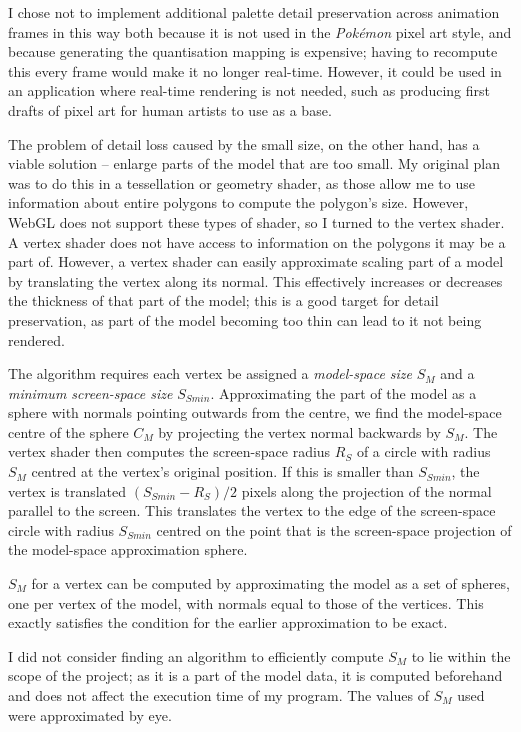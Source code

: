 \documentclass[12pt,twoside,notitlepage]{report}
\begin{document}
I chose not to implement additional palette detail preservation across animation frames in this way both because it is not used in the \textit{Pok\'{e}mon} pixel art style, and because generating the quantisation mapping is expensive; having to recompute this every frame would make it no longer real-time. However, it could be used in an application where real-time rendering is not needed, such as producing first drafts of pixel art for human artists to use as a base.

The problem of detail loss caused by the small size, on the other hand, has a viable solution -- enlarge parts of the model that are too small. My original plan was to do this in a tessellation or geometry shader, as those allow me to use information about entire polygons to compute the polygon's size. However, WebGL does not support these types of shader, so I turned to the vertex shader. A vertex shader does not have access to information on the polygons it may be a part of. However, a vertex shader can easily approximate scaling part of a model by translating the vertex along its normal. This effectively increases or decreases the thickness of that part of the model; this is a good target for detail preservation, as part of the model becoming too thin can lead to it not being rendered.

The algorithm requires each vertex be assigned a \textit{model-space size} $S_{M}$ and a \textit{minimum screen-space size} $S_{Smin}$. Approximating the part of the model as a sphere with normals pointing outwards from the centre, we find the model-space centre of the sphere $C_{M}$ by projecting the vertex normal backwards by $S_{M}$. The vertex shader then computes the screen-space radius $R_{S}$ of a circle with radius $S_{M}$ centred at the vertex's original position. If this is smaller than $S_{Smin}$, the vertex is translated $(S_{Smin} - R_{S}) / 2$ pixels along the projection of the normal parallel to the screen. This translates the vertex to the edge of the screen-space circle with radius $S_{Smin}$ centred on the point that is the screen-space projection of the model-space approximation sphere.

$S_{M}$ for a vertex can be computed by approximating the model as a set of spheres, one per vertex of the model, with normals equal to those of the vertices. This exactly satisfies the condition for the earlier approximation to be exact.

I did not consider finding an algorithm to efficiently compute $S_{M}$ to lie within the scope of the project; as it is a part of the model data, it is computed beforehand and does not affect the execution time of my program. The values of $S_{M}$ used were approximated by eye.
\end{document}
